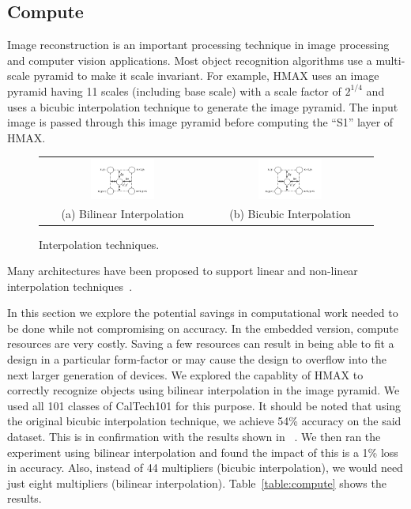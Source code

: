 \subsection{Compute}
Image reconstruction is an important processing technique in image processing and computer vision applications. Most object recognition algorithms use a multi-scale 
pyramid to make it scale invariant. For example, HMAX uses an image pyramid having 11 scales (including base scale) with a scale factor of $2^{1/4}$ and 
uses a bicubic interpolation technique 
to generate the image pyramid. The input image is passed through this image pyramid before computing the ``S1'' layer of HMAX. 

\begin{figure}[!htb]
\centering
\begin{tabular}{@{}c@{} @{}c@{}}
\includegraphics[width=0.4\textwidth]{./figures/bilinear.pdf} & \includegraphics[width=0.4\textwidth]{./figures/bilinear.pdf}\\[\abovecaptionskip]
\small (a) Bilinear Interpolation & \small (b) Bicubic Interpolation
\end{tabular}
\vspace{1pt}
\caption{Interpolation techniques.}
\label{tab:interpolation}
\end{figure}

Many architectures have been proposed to support linear 
and non-linear interpolation techniques~\cite{kesturdac}.

In this section we explore the potential savings in computational work needed to be done while not compromising on accuracy. 
In the embedded version, compute resources are very costly. Saving a few resources can result in being able to 
fit a design in a particular form-factor or may cause the design to overflow into the next larger generation of devices. We explored the 
capablity of HMAX to correctly recognize objects using bilinear interpolation in the image pyramid. We used all 101 classes of CalTech101 
for this purpose. It should be noted that using the original bicubic interpolation technique, we achieve 54\% accuracy on the said dataset. This is in confirmation with the results shown in ~\cite{Mutch2008}. 
We then ran the experiment using bilinear interpolation and found the impact of this is a 1\% loss in accuracy. Also, instead of 
44 multipliers (bicubic interpolation), we would need just eight multipliers (bilinear interpolation). Table~\ref{table:compute} shows the 
results. 

